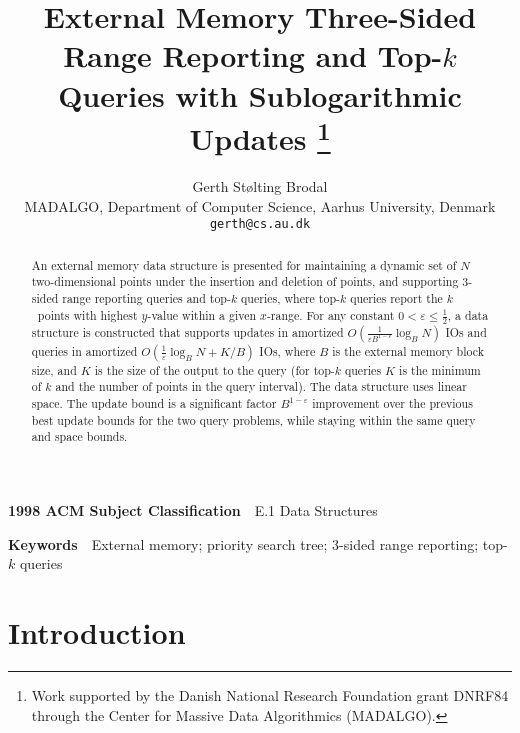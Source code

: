 \documentclass[11pt]{article}
\title{External Memory Three-Sided Range Reporting and Top-$k$ Queries with Sublogarithmic Updates%
\thanks{Work supported by the Danish National Research Foundation
  grant DNRF84 through the Center for Massive Data Algorithmics (MADALGO).}}
\author{Gerth Stølting Brodal \\[2ex]
  MADALGO, Department of Computer Science, Aarhus University, Denmark \\
  \texttt{gerth@cs.au.dk}}
\begin{document}
\maketitle

\begin{abstract}
  An external memory data structure is presented for maintaining a
  dynamic set of $N$ two-dimensional points under the insertion and
  deletion of points, and supporting 3-sided range reporting queries
  and top-$k$ queries, where top-$k$ queries report the $k$~points
  with highest $y$-value within a given $x$-range.  For any constant
  $0<\varepsilon\leq \frac{1}{2}$, a data structure is constructed
  that supports updates in amortized $O(\frac{1}{\varepsilon
    B^{1-\varepsilon}}\log_B N)$ IOs and queries in amortized
  $O(\frac{1}{\varepsilon}\log_B N+K/B)$ IOs, where $B$ is the
  external memory block size, and $K$ is the size of the output to the
  query (for top-$k$ queries $K$ is the minimum of $k$ and the number
  of points in the query interval). The data structure uses linear
  space. The update bound is a significant factor $B^{1-\varepsilon}$
  improvement over the previous best update bounds for the two query
  problems, while staying within the same query and space bounds.
\end{abstract}

\vspace{1ex}
\noindent\textbf{1998 ACM Subject Classification}~~E.1 Data Structures

\noindent\textbf{Keywords}~~External memory; 
priority search tree;
3-sided range reporting;
top-$k$ queries

\section{Introduction}
\end{document}
